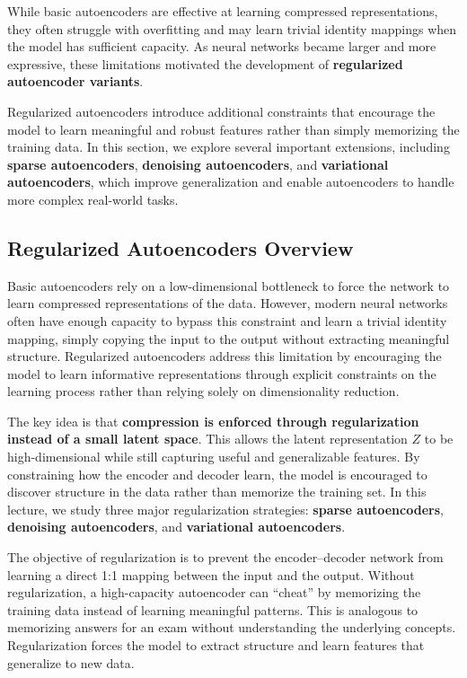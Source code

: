 \documentclass{article}
\begin{document}
While basic autoencoders are effective at learning compressed representations, they often struggle with overfitting and may learn trivial identity mappings when the model has sufficient capacity. As neural networks became larger and more expressive, these limitations motivated the development of \textbf{regularized autoencoder variants}. 

Regularized autoencoders introduce additional constraints that encourage the model to learn meaningful and robust features rather than simply memorizing the training data. In this section, we explore several important extensions, including \textbf{sparse autoencoders}, \textbf{denoising autoencoders}, and \textbf{variational autoencoders}, which improve generalization and enable autoencoders to handle more complex real-world tasks.


\subsection{Regularized Autoencoders Overview}

Basic autoencoders rely on a low-dimensional bottleneck to force the network to learn compressed representations of the data. However, modern neural networks often have enough capacity to bypass this constraint and learn a trivial identity mapping, simply copying the input to the output without extracting meaningful structure. Regularized autoencoders address this limitation by encouraging the model to learn informative representations through explicit constraints on the learning process rather than relying solely on dimensionality reduction.

The key idea is that \textbf{compression is enforced through regularization instead of a small latent space}. This allows the latent representation \(Z\) to be high-dimensional while still capturing useful and generalizable features. By constraining how the encoder and decoder learn, the model is encouraged to discover structure in the data rather than memorize the training set. In this lecture, we study three major regularization strategies: \textbf{sparse autoencoders}, \textbf{denoising autoencoders}, and \textbf{variational autoencoders}.

The objective of regularization is to prevent the encoder–decoder network from learning a direct 1:1 mapping between the input and the output. Without regularization, a high-capacity autoencoder can ``cheat'' by memorizing the training data instead of learning meaningful patterns. This is analogous to memorizing answers for an exam without understanding the underlying concepts. Regularization forces the model to extract structure and learn features that generalize to new data.
\end{document}

